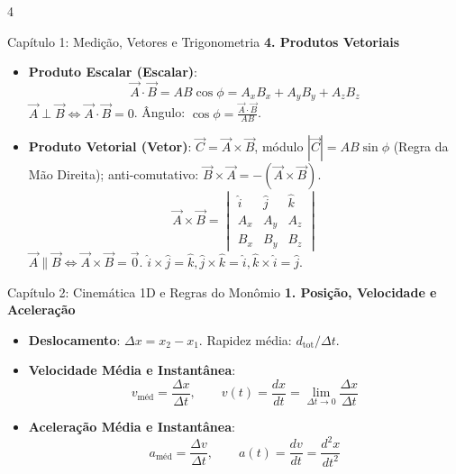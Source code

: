 \documentclass[9pt,a4paper,landscape]{extarticle}
\begin{document}
\begin{multicols*}{4}
\begin{topicbox}{Capítulo 1: Medição, Vetores e Trigonometria}
\textbf{4. Produtos Vetoriais}
\begin{itemize}
    \item \textbf{Produto Escalar (Escalar)}:
    \begin{equation*}
        \vec{A} \cdot \vec{B} = AB\cos\phi = A_x B_x + A_y B_y + A_z B_z
    \end{equation*}
    $\vec{A} \perp \vec{B} \iff \vec{A}\cdot\vec{B}=0$. Ângulo: $\cos\phi = \frac{\vec{A}\cdot\vec{B}}{AB}$.
    \item \textbf{Produto Vetorial (Vetor)}: $\vec{C} = \vec{A} \times \vec{B}$, módulo $|\vec{C}| = AB\sin\phi$ (Regra da Mão Direita); anti-comutativo: $\vec{B}\times\vec{A} = -(\vec{A}\times\vec{B})$.
    \begin{equation*}
        \vec{A} \times \vec{B} = \begin{vmatrix} \hat{i} & \hat{j} & \hat{k} \\ A_x & A_y & A_z \\ B_x & B_y & B_z \end{vmatrix}
    \end{equation*}
    $\vec{A} \parallel \vec{B} \iff \vec{A}\times\vec{B} = \vec{0}$. $\hat{i}\times\hat{j}=\hat{k}, \hat{j}\times\hat{k}=\hat{i}, \hat{k}\times\hat{i}=\hat{j}$.
\end{itemize}
\end{topicbox}

\begin{topicbox}{Capítulo 2: Cinemática 1D e Regras do Monômio}
\textbf{1. Posição, Velocidade e Aceleração}
\begin{itemize}
    \item \textbf{Deslocamento}: $\Delta x = x_2 - x_1$. Rapidez média: $d_{\text{tot}}/\Delta t$.
    \item \textbf{Velocidade Média e Instantânea}:
    \begin{equation*}
        v_{\text{méd}} = \frac{\Delta x}{\Delta t}, \qquad v(t) = \frac{dx}{dt} = \lim_{\Delta t \to 0} \frac{\Delta x}{\Delta t}
    \end{equation*}
    \item \textbf{Aceleração Média e Instantânea}:
    \begin{equation*}
        a_{\text{méd}} = \frac{\Delta v}{\Delta t}, \qquad a(t) = \frac{dv}{dt} = \frac{d^2 x}{dt^2}
    \end{equation*}
\end{itemize}


\end{topicbox}
\end{multicols*}
\end{document}

